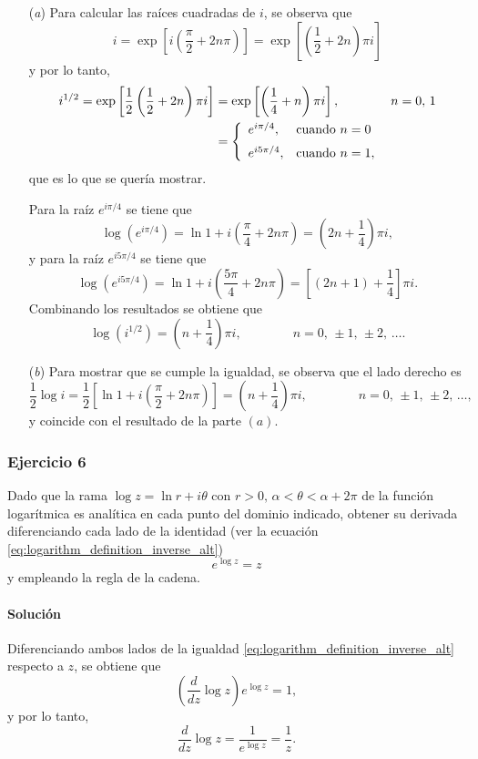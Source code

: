 \documentclass[a4paper]{report}
\begin{document}
\begin{enumerate}
 \item[(\textit{a})] Para calcular las raíces cuadradas de \(i\), se observa que 
 \[
  i=\exp\left[i\left(\frac{\pi}{2}+2n\pi\right)\right]=\exp\left[\left(\frac{1}{2}+2n\right)\pi i\right]
 \]
 y por lo tanto,
 \begin{align*}
  i^{1/2}=\exp\left[\frac{1}{2}\left(\frac{1}{2}+2n\right)\pi i\right]
   &=\exp\left[\left(\frac{1}{4}+n\right)\pi i\right],
   \qquad\qquad n=0,\,1\\
   &=\left\{ 
   \begin{array}{ll}
    e^{i\pi/4}, &\textrm{cuando }n=0\\[\medskipamount]
    e^{i5\pi/4}, &\textrm{cuando }n=1,
   \end{array}
   \right.
 \end{align*}
 que es lo que se quería mostrar.
 
 Para la raíz \(e^{i\pi/4}\) se tiene que 
 \[
  \log(e^{i\pi/4})=\ln1+i\left(\frac{\pi}{4}+2n\pi\right)=\left(2n+\frac{1}{4}\right)\pi i,
 \]
 y para la raíz \(e^{i5\pi/4}\) se tiene que 
 \[
  \log(e^{i5\pi/4})=\ln1+i\left(\frac{5\pi}{4}+2n\pi\right)=\left[(2n+1)+\frac{1}{4}\right]\pi i.
 \]
 Combinando los resultados se obtiene que  
 \[
  \log(i^{1/2})=\left(n+\frac{1}{4}\right)\pi i,\qquad\qquad n=0,\,\pm1,\,\pm2,\,\dots.
 \]
 \item[(\textit{b})] Para mostrar que se cumple la igualdad, se observa que el lado derecho es
 \[
  \frac{1}{2}\log i=\frac{1}{2}\left[\ln1+i\left(\frac{\pi}{2}+2n\pi\right)\right]
  =\left(n+\frac{1}{4}\right)\pi i,\qquad\qquad n=0,\,\pm1,\,\pm2,\,\dots,
 \]
 y coincide con el resultado de la parte \((a)\).
\end{enumerate}

\subsubsection{Ejercicio 6}

Dado que la rama \(\log z=\ln r+i\theta\) con \(r>0,\,\alpha<\theta<\alpha+2\pi\) de la función logarítmica es analítica en cada punto del dominio indicado, obtener su derivada diferenciando cada lado de la identidad (ver la ecuación \ref{eq:logarithm_definition_inverse_alt})
\[
 e^{\log z}=z
\]
y empleando la regla de la cadena.

\paragraph{Solución} Diferenciando ambos lados de la igualdad  \ref{eq:logarithm_definition_inverse_alt} respecto a \(z\), se obtiene que 
\[
 \left(\frac{d}{dz}\log z\right)e^{\log z}=1,
\]
y por lo tanto,
\[
 \frac{d}{dz}\log z=\frac{1}{e^{\log z}}=\frac{1}{z}.
\]
\end{document}
